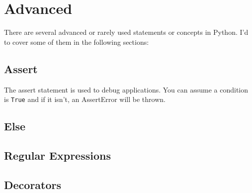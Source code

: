 \section{Advanced}

    There are several advanced or rarely used statements or concepts in Python.
    I'd to cover some of them in the following sections:

    \subsection{Assert}
        The assert statement is used to debug applications.
        You can assume a condition is \texttt{True} and if it isn't,
        an AssertError will be thrown.


    \subsection{Else}

    \subsection{Regular Expressions}

    \subsection{Decorators}
